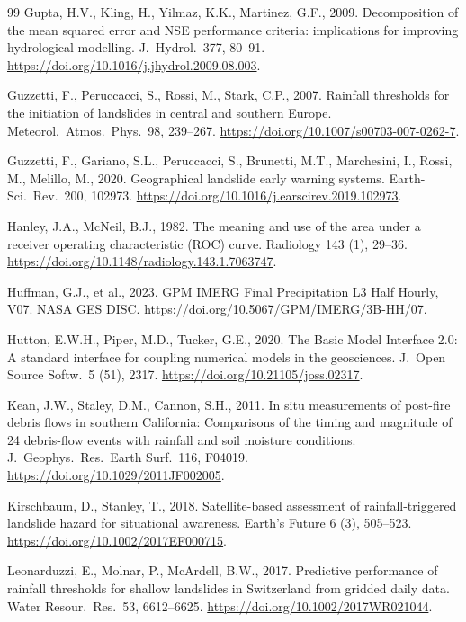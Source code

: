 \documentclass[authoryear,preprint,review,12pt]{elsarticle}
\begin{document}
\begin{thebibliography}{99}
Gupta, H.V., Kling, H., Yilmaz, K.K., Martinez, G.F., 2009. Decomposition of the
mean squared error and NSE performance criteria: implications for improving
hydrological modelling. J.\ Hydrol.\ 377, 80--91.
\url{https://doi.org/10.1016/j.jhydrol.2009.08.003}.

Guzzetti, F., Peruccacci, S., Rossi, M., Stark, C.P., 2007. Rainfall thresholds
for the initiation of landslides in central and southern Europe. Meteorol.\
Atmos.\ Phys.\ 98, 239--267. \url{https://doi.org/10.1007/s00703-007-0262-7}.

Guzzetti, F., Gariano, S.L., Peruccacci, S., Brunetti, M.T., Marchesini, I.,
Rossi, M., Melillo, M., 2020. Geographical landslide early warning systems.
Earth-Sci.\ Rev.\ 200, 102973.
\url{https://doi.org/10.1016/j.earscirev.2019.102973}.

Hanley, J.A., McNeil, B.J., 1982. The meaning and use of the area under a
receiver operating characteristic (ROC) curve. Radiology 143 (1), 29--36.
\url{https://doi.org/10.1148/radiology.143.1.7063747}.

Huffman, G.J., et al., 2023. GPM IMERG Final Precipitation L3 Half Hourly, V07.
NASA GES DISC. \url{https://doi.org/10.5067/GPM/IMERG/3B-HH/07}.

Hutton, E.W.H., Piper, M.D., Tucker, G.E., 2020. The Basic Model Interface 2.0: A
standard interface for coupling numerical models in the geosciences. J.\ Open
Source Softw.\ 5 (51), 2317. \url{https://doi.org/10.21105/joss.02317}.

Kean, J.W., Staley, D.M., Cannon, S.H., 2011. In situ measurements of post-fire
debris flows in southern California: Comparisons of the timing and magnitude of 24
debris-flow events with rainfall and soil moisture conditions. J.\ Geophys.\ Res.\
Earth Surf.\ 116, F04019. \url{https://doi.org/10.1029/2011JF002005}.

\bibitem[Kirschbaum and Stanley(2018)]{kirschbaum2018}
Kirschbaum, D., Stanley, T., 2018. Satellite-based assessment of
rainfall-triggered landslide hazard for situational awareness. Earth's Future 6
(3), 505--523. \url{https://doi.org/10.1002/2017EF000715}.

Leonarduzzi, E., Molnar, P., McArdell, B.W., 2017. Predictive performance of
rainfall thresholds for shallow landslides in Switzerland from gridded daily data.
Water Resour.\ Res.\ 53, 6612--6625. \url{https://doi.org/10.1002/2017WR021044}.


\end{thebibliography}
\end{document}
